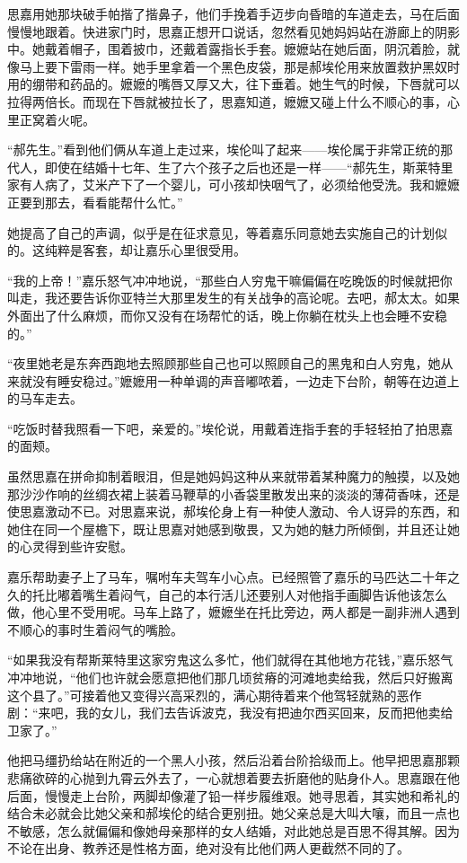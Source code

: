 \par 思嘉用她那块破手帕揩了揩鼻子，他们手挽着手迈步向昏暗的车道走去，马在后面慢慢地跟着。快进家门时，思嘉正想开口说话，忽然看见她妈妈站在游廊上的阴影中。她戴着帽子，围着披巾，还戴着露指长手套。嬷嬷站在她后面，阴沉着脸，就像马上要下雷雨一样。她手里拿着一个黑色皮袋，那是郝埃伦用来放置救护黑奴时用的绷带和药品的。嬷嬷的嘴唇又厚又大，往下垂着。她生气的时候，下唇就可以拉得两倍长。而现在下唇就被拉长了，思嘉知道，嬷嬷又碰上什么不顺心的事，心里正窝着火呢。
\par “郝先生。”看到他们俩从车道上走过来，埃伦叫了起来——埃伦属于非常正统的那代人，即使在结婚十七年、生了六个孩子之后也还是一样——“郝先生，斯莱特里家有人病了，艾米产下了一个婴儿，可小孩却快咽气了，必须给他受洗。我和嬷嬷正要到那去，看看能帮什么忙。”
\par 她提高了自己的声调，似乎是在征求意见，等着嘉乐同意她去实施自己的计划似的。这纯粹是客套，却让嘉乐心里很受用。
\par “我的上帝！”嘉乐怒气冲冲地说，“那些白人穷鬼干嘛偏偏在吃晚饭的时候就把你叫走，我还要告诉你亚特兰大那里发生的有关战争的高论呢。去吧，郝太太。如果外面出了什么麻烦，而你又没有在场帮忙的话，晚上你躺在枕头上也会睡不安稳的。”
\par “夜里她老是东奔西跑地去照顾那些自己也可以照顾自己的黑鬼和白人穷鬼，她从来就没有睡安稳过。”嬷嬷用一种单调的声音嘟哝着，一边走下台阶，朝等在边道上的马车走去。
\par “吃饭时替我照看一下吧，亲爱的。”埃伦说，用戴着连指手套的手轻轻拍了拍思嘉的面颊。
\par 虽然思嘉在拼命抑制着眼泪，但是她妈妈这种从来就带着某种魔力的触摸，以及她那沙沙作响的丝绸衣裙上装着马鞭草的小香袋里散发出来的淡淡的薄荷香味，还是使思嘉激动不已。对思嘉来说，郝埃伦身上有一种使人激动、令人讶异的东西，和她住在同一个屋檐下，既让思嘉对她感到敬畏，又为她的魅力所倾倒，并且还让她的心灵得到些许安慰。
\par 嘉乐帮助妻子上了马车，嘱咐车夫驾车小心点。已经照管了嘉乐的马匹达二十年之久的托比嘟着嘴生着闷气，自己的本行活儿还要别人对他指手画脚告诉他该怎么做，他心里不受用呢。马车上路了，嬷嬷坐在托比旁边，两人都是一副非洲人遇到不顺心的事时生着闷气的嘴脸。
\par “如果我没有帮斯莱特里这家穷鬼这么多忙，他们就得在其他地方花钱，”嘉乐怒气冲冲地说，“他们也许就会愿意把他们那几顷贫瘠的河滩地卖给我，然后只好搬离这个县了。”可接着他又变得兴高采烈的，满心期待着来个他驾轻就熟的恶作剧：“来吧，我的女儿，我们去告诉波克，我没有把迪尔西买回来，反而把他卖给卫家了。”
\par 他把马缰扔给站在附近的一个黑人小孩，然后沿着台阶拾级而上。他早把思嘉那颗悲痛欲碎的心抛到九霄云外去了，一心就想着要去折磨他的贴身仆人。思嘉跟在他后面，慢慢走上台阶，两脚却像灌了铅一样步履维艰。她寻思着，其实她和希礼的结合未必就会比她父亲和郝埃伦的结合更别扭。她父亲总是大叫大嚷，而且一点也不敏感，怎么就偏偏和像她母亲那样的女人结婚，对此她总是百思不得其解。因为不论在出身、教养还是性格方面，绝对没有比他们两人更截然不同的了。


